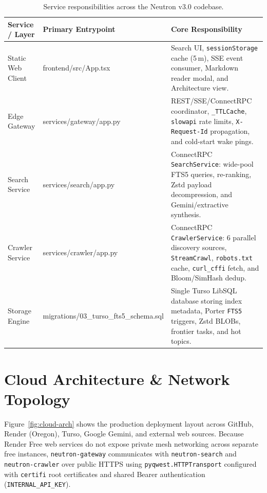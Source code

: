 \documentclass[10pt,a4paper]{article}
\begin{document}
\begin{table}[H]
\centering
\small
\renewcommand{\arraystretch}{1.28}
\begin{tabularx}{\textwidth}{@{}p{3.4cm} >{\ttfamily\scriptsize\raggedright\arraybackslash}p{4.1cm} >{\raggedright\arraybackslash}X@{}}
\toprule
\textbf{Service / Layer} & \textbf{Primary Entrypoint} & \textbf{Core Responsibility} \\
\midrule
Static Web Client & frontend/src/App.tsx & Search UI, \texttt{sessionStorage} cache (5\,m), SSE event consumer, Markdown reader modal, and Architecture view. \\
Edge Gateway & services/gateway/app.py & REST/SSE/ConnectRPC coordinator, \texttt{\_TTLCache}, \texttt{slowapi} rate limits, \texttt{X-Request-Id} propagation, and cold-start wake pings. \\
Search Service & services/search/app.py & ConnectRPC \texttt{SearchService}: wide-pool FTS5 queries, re-ranking, Zstd payload decompression, and Gemini/extractive synthesis. \\
Crawler Service & services/crawler/app.py & ConnectRPC \texttt{CrawlerService}: 6 parallel discovery sources, \texttt{StreamCrawl}, \texttt{robots.txt} cache, \texttt{curl\_cffi} fetch, and Bloom/SimHash dedup. \\
Storage Engine & migrations/03\_turso\_fts5\_schema.sql & Single Turso LibSQL database storing index metadata, Porter \texttt{FTS5} triggers, Zstd BLOBs, frontier tasks, and hot topics. \\
\bottomrule
\end{tabularx}
\caption{Service responsibilities across the Neutron v3.0 codebase.}
\end{table}

\clearpage
\section{Cloud Architecture \& Network Topology}

Figure~\ref{fig:cloud-arch} shows the production deployment layout across GitHub, Render (Oregon), Turso, Google Gemini, and external web sources. Because Render Free web services do not expose private mesh networking across separate free instances, \texttt{neutron-gateway} communicates with \texttt{neutron-search} and \texttt{neutron-crawler} over public HTTPS using \texttt{pyqwest.HTTPTransport} configured with \texttt{certifi} root certificates and shared Bearer authentication (\texttt{INTERNAL\_API\_KEY}).
\end{document}
